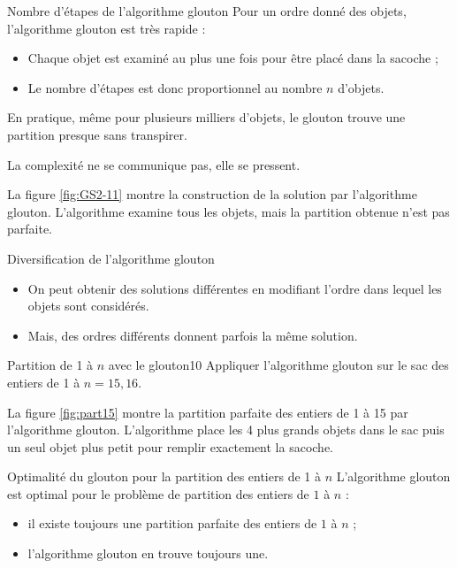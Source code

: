 \documentclass[a4paper,twoside]{article}
\begin{document}
  \begin{remarque}{Nombre d'étapes de l'algorithme glouton}
    Pour un ordre donné des objets, l'algorithme glouton est très rapide :
    \begin{itemize}
    \item Chaque objet est examiné au plus une fois pour être placé dans la sacoche ;
    \item Le nombre d'étapes est donc proportionnel au nombre $n$ d'objets.
    \end{itemize}
  \end{remarque}
  En pratique, même pour plusieurs milliers d'objets, le glouton trouve une partition presque sans transpirer.
  \begin{epigramme}
    La complexité ne se communique pas, elle se pressent.
  \end{epigramme}

  
  La figure \ref{fig:GS2-11} montre la construction de la solution par l'algorithme glouton.
  L'algorithme examine tous les objets, mais la partition obtenue n'est pas parfaite.

  \begin{remarque}{Diversification de l'algorithme glouton}
    \begin{itemize}
    \item On peut obtenir des solutions différentes en modifiant l'ordre dans lequel les objets sont considérés.
    \item Mais, des ordres différents donnent parfois la même solution.
    \end{itemize}
  \end{remarque}

  \begin{exercice}[label=ex1-GS]{Partition de 1 à $n$ avec le glouton}{10}
    Appliquer l'algorithme glouton sur le sac des entiers de 1 à $n = 15, 16$.
  \end{exercice}

  
  \ifshowsols
    
  \fi

  La figure \ref{fig:part15} montre la partition parfaite des entiers de 1 à 15 par l'algorithme glouton.
  L'algorithme place les 4 plus grands objets dans le sac puis un seul objet plus petit pour remplir exactement la sacoche.

  \begin{remarque}{Optimalité du glouton pour la partition des entiers de 1 à $n$}
    L'algorithme glouton est optimal pour le problème de partition des entiers de $1$ à $n$ :
    \begin{itemize}
    \item il existe toujours une partition parfaite des entiers de $1$ à $n$ ;
    \item l'algorithme glouton en trouve toujours une.
    \end{itemize}

  \end{remarque}
\end{document}

